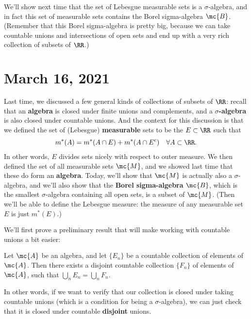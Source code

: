 We'll show next time that the set of Lebesgue measurable sets is a $\sigma$-algebra, and in fact this set of measurable sets contains the Borel sigma-algebra $\mc{B}$. (Remember that this Borel sigma-algebra is pretty big, because we can take countable unions and intersections of open sets and end up with a very rich collection of subsets of $\RR$.)


\pagebreak\section*{March 16, 2021}

Last time, we discussed a few general kinds of collections of subsets of $\RR$: recall that an \textbf{algebra} is closed under finite unions and complements, and a \textbf{$\sigma$-algebra} is also closed under countable unions. And the context for this discussion is that we defined the set of (Lebesgue) \textbf{measurable} sets to be the $E \subset \RR$ such that
\[
    m^\ast(A) = m^\ast(A \cap E) + m^\ast(A \cap E^c) \quad \forall A \subset \RR.
\]
In other words, $E$ divides sets nicely with respect to outer measure. We then defined the set of all measurable sets $\mc{M}$, and we showed last time that these do form an \textbf{algebra}. Today, we'll show that $\mc{M}$ is actually also a $\sigma$-algebra, and we'll also show that the \textbf{Borel sigma-algebra} $\mc{B}$, which is the smallest $\sigma$-algebra containing all open sets, is a subset of $\mc{M}$. (Then we'll be able to define the Lebesgue measure: the measure of any measurable set $E$ is just $m^\ast(E)$.)

We'll first prove a preliminary result that will make working with countable unions a bit easier: 

\begin{lemma}\label{countabledisjoint}
Let $\mc{A}$ be an algebra, and let $\{E_n\}$ be a countable collection of elements of $\mc{A}$. Then there exists a disjoint countable collection $\{F_n\}$ of elements of $\mc{A}$, such that $\bigcup_n E_n = \bigcup_n F_n$. 
\end{lemma}

In other words, if we want to verify that our collection is closed under taking countable unions (which is a condition for being a $\sigma$-algebra), we can just check that it is closed under countable \textbf{disjoint} unions.


